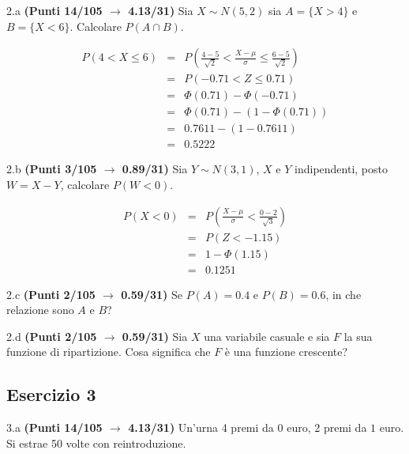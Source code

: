 \documentclass[
  11pt,
]{book}
\theoremstyle{mytheoremstyle}
\theoremstyle{mydefstyle}
\newenvironment{sol}
  {
  \begin{tcolorbox}[enhanced,breakable,arc=0.1mm,boxrule=1pt,colback=white,colframe=iblue,
  title=\bf \fontfamily{lmss}\selectfont \hspace{.5 cm} Soluzione,drop fuzzy shadow]

}{
\end{tcolorbox}
  }
\begin{document}
2.a \textbf{(Punti 14/105 \(\rightarrow\) 4.13/31)} Sia \(X\sim N(5,2)\) sia \(A=\{X>4\}\) e \(B=\{X<6\}\). Calcolare \(P(A\cap B)\).

\begin{sol}
\begin{eqnarray*}
   P( 4 < X \leq  6 ) &=& P\left( \frac { 4  -  5 }{\sqrt{ 2 }} < \frac { X  -  \mu }{ \sigma } \leq \frac { 6  -  5 }{\sqrt{ 2 }}\right)  \\
              &=& P\left(  -0.71  < Z \leq  0.71 \right) \\
              &=& \Phi( 0.71 )-\Phi( -0.71 )\\
              &=&  \Phi( 0.71 )-(1-\Phi( 0.71 )) \\ &=&  0.7611 -(1- 0.7611 ) \\ 
              &=&  0.5222 
   \end{eqnarray*}

\end{sol}

2.b \textbf{(Punti 3/105 \(\rightarrow\) 0.89/31)} Sia \(Y\sim N(3,1)\), \(X\) e \(Y\) indipendenti, posto \(W=X-Y\), calcolare \(P(W<0)\).

\begin{sol}
\begin{eqnarray*}
      P( X   <   0 ) 
        &=& P\left(  \frac { X  -  \mu }{ \sigma }  <  \frac { 0  -  2 }{\sqrt{ 3 }} \right)  \\
                 &=& P\left(  Z   <   -1.15 \right) \\    
                 &=&  1-\Phi( 1.15 ) \\ &=&  0.1251 
      \end{eqnarray*}

\end{sol}

2.c \textbf{(Punti 2/105 \(\rightarrow\) 0.59/31)} Se \(P(A)=0.4\) e \(P(B)=0.6\), in che relazione sono \(A\) e \(B\)?

2.d \textbf{(Punti 2/105 \(\rightarrow\) 0.59/31)} Sia \(X\) una variabile casuale e sia \(F\) la sua funzione di ripartizione. Cosa significa che \(F\) è una funzione crescente?

\subsection{Esercizio 3}\label{esercizio-3-36}

3.a \textbf{(Punti 14/105 \(\rightarrow\) 4.13/31)} Un'urna 4 premi da \(\mbox{0}\) euro, 2 premi da \(\mbox{1}\) euro.
Si estrae 50 volte con reintroduzione.
\end{document}
